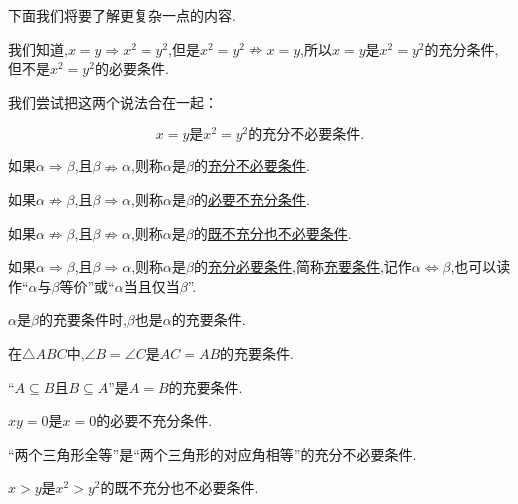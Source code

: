 \documentclass[lang=cn,math=cm,chinesefont=nofont,11pt,scheme=chinese,twocol]{elegantbook}
\begin{document}
\hspace*{\fill}

下面我们将要了解更复杂一点的内容.

我们知道,$x=y\Rightarrow x^2=y^2$,但是$x^2=y^2\nRightarrow x=y$,所以$x=y$是$x^2=y^2$的充分条件,但不是$x^2=y^2$的必要条件.

我们尝试把这两个说法合在一起：

$$x=y\text{是}x^2=y^2\text{的}\textbf{充分不必要条件.}$$

\begin{definition}
  如果$\alpha\Rightarrow\beta$,且$\beta\nRightarrow\alpha$,则称$\alpha$是$\beta$的\underline{充分不必要条件}.

  如果$\alpha\nRightarrow\beta$,且$\beta\Rightarrow\alpha$,则称$\alpha$是$\beta$的\underline{必要不充分条件}.

  如果$\alpha\nRightarrow\beta$,且$\beta\nRightarrow\alpha$,则称$\alpha$是$\beta$的\underline{既不充分也不必要条件}.

  如果$\alpha\Rightarrow\beta$,且$\beta\Rightarrow\alpha$,则称$\alpha$是$\beta$的\underline{充分必要条件},简称\underline{充要条件},记作$\alpha\Leftrightarrow\beta$,也可以读作“$\alpha$与$\beta$等价”或“$\alpha$当且仅当$\beta$”.
\end{definition}

\begin{remark}
  $\alpha$是$\beta$的充要条件时,$\beta$也是$\alpha$的充要条件.
\end{remark}

\hspace*{\fill}

\begin{example}
  在$\triangle ABC$中,$\angle B=\angle C$是$AC=AB$的充要条件.
\end{example}

\begin{example}
  “$A\subseteq B$且$B\subseteq A”$是$A=B$的充要条件.
\end{example}

\begin{example}
  $xy=0$是$x=0$的必要不充分条件.
\end{example}

\begin{example}
  “两个三角形全等”是“两个三角形的对应角相等”的充分不必要条件.
\end{example}

\begin{example}
  $x>y$是$x^2>y^2$的既不充分也不必要条件.
\end{example}
\end{document}
